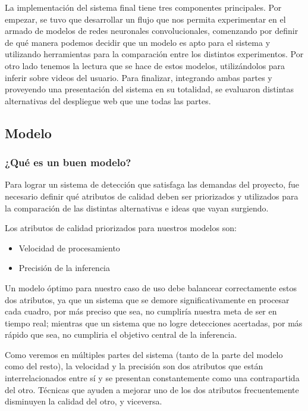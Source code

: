 \documentclass[a4paper]{article}
\begin{document}
La implementación del sistema final tiene tres componentes principales. Por empezar, se tuvo que desarrollar un flujo que nos permita experimentar en el armado de modelos de redes neuronales convolucionales, comenzando por definir de qué manera podemos decidir que un modelo es apto para el sistema y utilizando herramientas para la comparación entre los distintos experimentos. Por otro lado tenemos la lectura que se hace de estos modelos, utilizándolos para inferir sobre videos del usuario. Para finalizar, integrando ambas partes y proveyendo una presentación del sistema en su totalidad, se evaluaron distintas alternativas del despliegue web que une todas las partes.

\subsection{Modelo}

\subsubsection{¿Qué es un buen modelo?}

Para lograr un sistema de detección que satisfaga las demandas del proyecto, fue necesario definir qué atributos de calidad deben ser priorizados y utilizados para la comparación de las distintas alternativas e ideas que vayan surgiendo.

Los atributos de calidad priorizados para nuestros modelos son:

\begin{itemize}
    \item Velocidad de procesamiento
    \item Precisión de la inferencia
\end{itemize}

Un modelo óptimo para nuestro caso de uso debe balancear correctamente estos dos atributos, ya que un sistema que se demore significativamente en procesar cada cuadro, por más preciso que sea, no cumpliría nuestra meta de ser en tiempo real; mientras que un sistema que no logre detecciones acertadas, por más rápido que sea, no cumpliria el objetivo central de la inferencia.

Como veremos en múltiples partes del sistema (tanto de la parte del modelo como del resto), la velocidad y la precisión son dos atributos que están interrelacionados entre sí y se presentan constantemente como una contrapartida del otro. Técnicas que ayuden a mejorar uno de los dos atributos frecuentemente disminuyen la calidad del otro, y viceversa.
\end{document}
